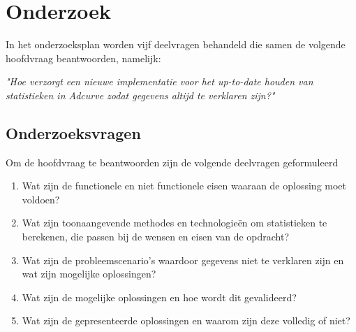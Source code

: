 \chapter{Onderzoek}





In het onderzoeksplan worden vijf deelvragen behandeld die samen de volgende hoofdvraag beantwoorden, namelijk:

{\large \textit{"Hoe verzorgt een nieuwe implementatie voor het up-to-date houden van statistieken in Adcurve zodat gegevens altijd te verklaren zijn?"}}
\medskip


\section{Onderzoeksvragen}

Om de hoofdvraag te beantwoorden zijn de volgende deelvragen geformuleerd

\begin{enumerate}
\item Wat zijn de functionele en niet functionele eisen waaraan de oplossing moet voldoen?
\item Wat zijn toonaangevende methodes en technologieën om statistieken te berekenen, die passen bij de wensen en eisen van de opdracht?
\item Wat zijn de probleemscenario's waardoor gegevens niet te verklaren zijn en wat zijn mogelijke oplossingen?
\item Wat zijn de mogelijke oplossingen en hoe wordt dit gevalideerd?
\item Wat zijn de gepresenteerde oplossingen en waarom zijn deze volledig of niet?
\end{enumerate}

